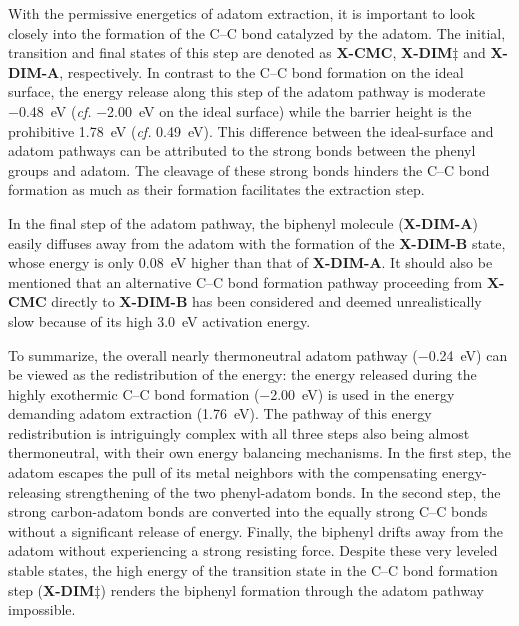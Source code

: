 \documentclass[aps,prb,reprint,amsmath,amssymb]{revtex4-1}
\newcommand{\comm}{\color{green}} %
\begin{document}
{With the permissive energetics of adatom extraction, it is important to look closely into the formation of the C--C bond catalyzed by the adatom. 
The initial, transition and final states of this step are denoted as \textbf{X-CMC}, \textbf{X-DIM$\ddagger$} and \textbf{X-DIM-A}, respectively.
In contrast to the C--C bond formation on the ideal surface, the energy release along this step of the adatom pathway is moderate \SI{-0.48}{\electronvolt} (\textit{cf.} \SI{-2.00}{\electronvolt} on the ideal surface) while the barrier height is the prohibitive \SI{1.78}{\electronvolt} (\textit{cf.} \SI{0.49}{\electronvolt}). 
This difference between the ideal-surface and adatom pathways can be attributed to the strong bonds between the phenyl groups and adatom.
The cleavage of these strong bonds hinders the C--C bond formation as much as their formation facilitates the extraction step. %

In the final step of the adatom pathway, the biphenyl molecule (\textbf{X-DIM-A}) easily diffuses away from the adatom with the formation of the \textbf{X-DIM-B} state, whose energy is only \SI{0.08}{\electronvolt} higher than that of \textbf{X-DIM-A}. It should also be mentioned that an alternative C--C bond formation pathway proceeding from \textbf{X-CMC} directly to \textbf{X-DIM-B} has been considered and deemed unrealistically slow because of its high \SI{3.0}{\electronvolt} activation energy.

To summarize, the overall nearly thermoneutral adatom pathway (\SI{-0.24}{\electronvolt}) can be viewed as the redistribution of the energy: the energy released during the highly exothermic C--C bond formation (\SI{-2.00}{\electronvolt}) is used in the energy demanding adatom extraction (\SI{1.76}{\electronvolt}). The pathway of this energy redistribution is intriguingly complex with all three steps also being almost thermoneutral, with their own energy balancing mechanisms. %
In the first step, the adatom escapes the pull of its metal neighbors with the compensating energy-releasing strengthening of the two phenyl-adatom bonds. In the second step, the strong carbon-adatom bonds are converted into the equally strong C--C bonds without a significant release of energy. Finally, the biphenyl drifts away from the adatom without experiencing a strong resisting force. Despite these very leveled stable states, the high energy of the transition state in the C--C bond formation step (\textbf{X-DIM$\ddagger$}) renders the biphenyl formation through the adatom pathway impossible.

}
\end{document}
